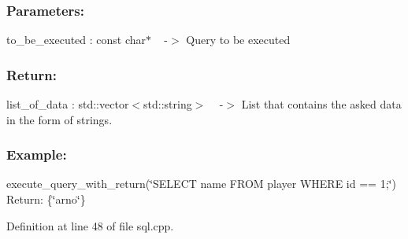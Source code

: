  \subsubsection*{Parameters\+: }

to\+\_\+be\+\_\+executed \+: const char$\ast$ ~\newline
-\/$>$ Query to be executed

\subsubsection*{Return\+: }

list\+\_\+of\+\_\+data \+: std\+::vector$<$std\+::string$>$ ~\newline
-\/$>$ List that contains the asked data in the form of strings.

\subsubsection*{Example\+: }

execute\+\_\+query\+\_\+with\+\_\+return(\char`\"{}\+S\+E\+L\+E\+C\+T name F\+R\+O\+M player W\+H\+E\+R\+E id == 1;\char`\"{})~\newline
Return\+: \{\char`\"{}arno\char`\"{}\} 

Definition at line 48 of file sql.\+cpp.

